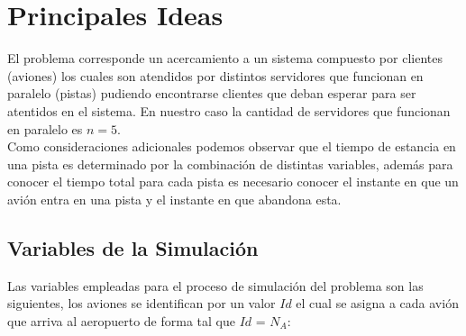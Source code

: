 \documentclass[a4paper,10pt,twocolumn]{article}
\begin{document}

\section{Principales Ideas}\label{sec:dev}
  
El problema corresponde un acercamiento a un sistema compuesto por clientes (aviones)
los cuales son atendidos por distintos servidores que funcionan en paralelo (pistas)
pudiendo encontrarse clientes que deban esperar para ser atentidos en el sistema.
En nuestro caso la cantidad de servidores que funcionan en paralelo es $n = 5$. \\

Como consideraciones adicionales podemos observar que el tiempo de estancia en una pista
es determinado por la combinaci\'on de distintas variables, adem\'as para conocer el tiempo
total para cada pista es necesario conocer el instante en que un avi\'on entra en una pista
y el instante en que abandona esta.

	\subsection{Variables de la Simulaci\'on}\label{sub:results}
	Las variables empleadas para el proceso de simulaci\'on del problema son las 
	siguientes, los aviones se identifican por un valor $Id$ el cual se asigna a cada 
	avi\'on que arriva al aeropuerto de forma tal que $Id$ = $N_{A}$:
\end{document}
